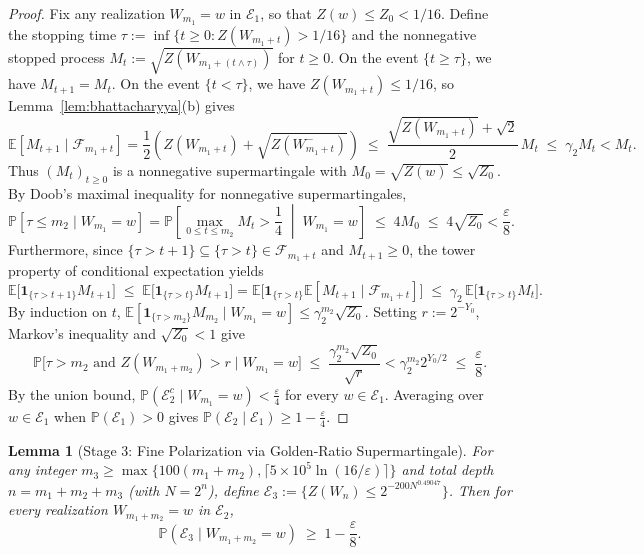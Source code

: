\documentclass[10pt,a4paper]{article}
\numberwithin{equation}{section}
\theoremstyle{plain}
\newtheorem{lemma}[theorem]{Lemma}
\theoremstyle{definition}
\theoremstyle{remark}
\newcommand{\cE}{\mathcal{E}}
\newcommand{\cF}{\mathcal{F}}
\newcommand{\bE}{\mathbb{E}}
\newcommand{\bP}{\mathbb{P}}
\begin{document}
\begin{proof}
Fix any realization $W_{m_1} = w$ in $\cE_1$, so that $Z(w) \le Z_0 < 1/16$. Define the stopping time $\tau := \inf\{t \ge 0 : Z(W_{m_1 + t}) > 1/16\}$ and the nonnegative stopped process $M_t := \sqrt{Z(W_{m_1 + (t \wedge \tau)})}$ for $t \ge 0$. On the event $\{t \ge \tau\}$, we have $M_{t+1} = M_t$. On the event $\{t < \tau\}$, we have $Z(W_{m_1 + t}) \le 1/16$, so Lemma~\ref{lem:bhattacharyya}(b) gives
\[
\bE[M_{t+1} \mid \cF_{m_1 + t}] = \frac{1}{2}\left(Z(W_{m_1 + t}) + \sqrt{Z(W_{m_1 + t}^-)}\right) \;\le\; \frac{\sqrt{Z(W_{m_1 + t})} + \sqrt{2}}{2}\, M_t \;\le\; \gamma_2 M_t < M_t.
\]
Thus $(M_t)_{t \ge 0}$ is a nonnegative supermartingale with $M_0 = \sqrt{Z(w)} \le \sqrt{Z_0}$. By Doob's maximal inequality for nonnegative supermartingales,
\[
\bP[\tau \le m_2 \mid W_{m_1} = w] = \bP\!\left[\max_{0 \le t \le m_2} M_t > \frac{1}{4} \;\middle\vert\; W_{m_1} = w\right] \;\le\; 4 M_0 \;\le\; 4\sqrt{Z_0} < \frac{\varepsilon}{8}.
\]
Furthermore, since $\{\tau > t + 1\} \subseteq \{\tau > t\} \in \cF_{m_1 + t}$ and $M_{t+1} \ge 0$, the tower property of conditional expectation yields
\[
\bE\bigl[\mathbf{1}_{\{\tau > t + 1\}} M_{t+1}\bigr] \;\le\; \bE\bigl[\mathbf{1}_{\{\tau > t\}} M_{t+1}\bigr] = \bE\bigl[\mathbf{1}_{\{\tau > t\}} \bE[M_{t+1} \mid \cF_{m_1 + t}]\bigr] \;\le\; \gamma_2\, \bE\bigl[\mathbf{1}_{\{\tau > t\}} M_t\bigr].
\]
By induction on $t$, $\bE[\mathbf{1}_{\{\tau > m_2\}} M_{m_2} \mid W_{m_1} = w] \le \gamma_2^{m_2} \sqrt{Z_0}$. Setting $r := 2^{-Y_0}$, Markov's inequality and $\sqrt{Z_0} < 1$ give
\[
\bP\bigl[\tau > m_2 \text{ and } Z(W_{m_1 + m_2}) > r \;\big\vert\; W_{m_1} = w\bigr] \;\le\; \frac{\gamma_2^{m_2}\sqrt{Z_0}}{\sqrt{r}} < \gamma_2^{m_2} 2^{Y_0/2} \;\le\; \frac{\varepsilon}{8}.
\]
By the union bound, $\bP(\cE_2^c \mid W_{m_1} = w) < \frac{\varepsilon}{4}$ for every $w \in \cE_1$. Averaging over $w \in \cE_1$ when $\bP(\cE_1) > 0$ gives $\bP(\cE_2 \mid \cE_1) \ge 1 - \frac{\varepsilon}{4}$.
\end{proof}

\begin{lemma}[Stage 3: Fine Polarization via Golden-Ratio Supermartingale]\label{lem:stage3}
For any integer $m_3 \ge \max\{100(m_1 + m_2), \lceil 5 \times 10^5 \ln(16/\varepsilon) \rceil\}$ and total depth $n = m_1 + m_2 + m_3$ (with $N = 2^n$), define $\cE_3 := \{Z(W_n) \le 2^{-200 N^{0.49047}}\}$. Then for every realization $W_{m_1 + m_2} = w$ in $\cE_2$,
\[
\bP(\cE_3 \mid W_{m_1 + m_2} = w) \;\ge\; 1 - \frac{\varepsilon}{8}.
\]
\end{lemma}
\end{document}
